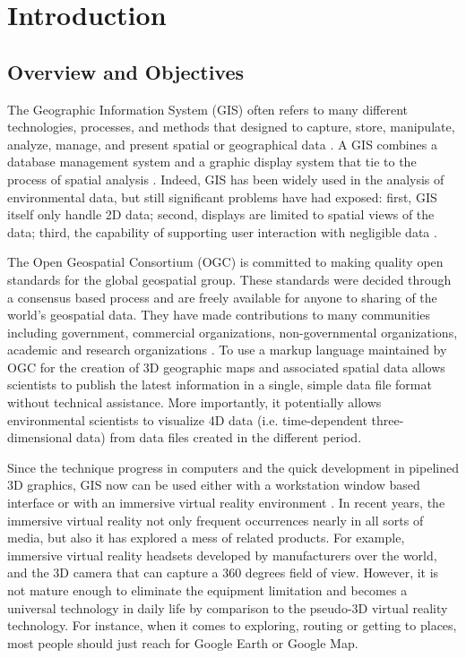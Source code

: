\label{chapter-introduction}
\chapter{Introduction}

\section{Overview and Objectives}

The Geographic Information System (GIS) often refers to many different technologies, processes, and methods that designed to capture, store, manipulate, analyze, manage, and present spatial or geographical data \cite{wiki.gis.2016}. A GIS combines a database management system and a graphic display system that tie to the process of spatial analysis \cite{rhyne.virtual.1997}. Indeed, GIS has been widely used in the analysis of environmental data, but still significant problems have had exposed: first, GIS itself only handle 2D data; second, displays are limited to spatial views of the data; third, the capability of supporting user interaction with negligible data \cite{rhyne.visualization-gis.1994}. 

The Open Geospatial Consortium (OGC) is committed to making quality open standards for the global geospatial group. These standards were decided through a consensus based process and are freely available for anyone to sharing of the world's geospatial data. They have made contributions to many communities including government, commercial organizations, non-governmental organizations, academic and research organizations \cite{ogc.2016}. To use a markup language maintained by OGC for the creation of 3D geographic maps and associated spatial data allows scientists to publish the latest information in a single, simple data file format without technical assistance. More importantly, it potentially allows environmental scientists to visualize 4D data (i.e. time-dependent three-dimensional data) from data files created in the different period.

Since the technique progress in computers and the quick development in pipelined 3D graphics, GIS now can be used either with a workstation window based interface or with an immersive virtual reality environment \cite{koller.virtual-gis.1995}. In recent years, the immersive virtual reality not only frequent occurrences nearly in all sorts of media, but also it has explored a mess of related products. For example, immersive virtual reality headsets developed by manufacturers over the world, and the 3D camera that can capture a 360 degrees field of view. However, it is not mature enough to eliminate the equipment limitation and becomes a universal technology in daily life by comparison to the pseudo-3D virtual reality technology. For instance, when it comes to exploring, routing or getting to places, most people should just reach for Google Earth or Google Map.

